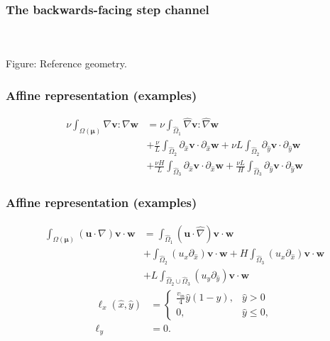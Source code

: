 \documentclass{beamer}
\begin{document}
\begin{frame}
  \frametitle{The backwards-facing step channel}
  \begin{center}
    \\~\\
    Figure: Reference geometry.
  \end{center}
\end{frame}

\begin{frame}
  \frametitle{Affine representation (examples)}
  \begin{align*}
    \nu \int_{\Omega(\bm \mu)} \nabla \bm v : \nabla \bm w
    &= \nu \int_{\hat{\Omega}_1} \hat{\nabla} \bm v : \hat{\nabla} \bm w \\
    &+ \frac{\nu}{L} \int_{\hat{\Omega}_2} \partial_{\hat{x}} \bm v \cdot \partial_{\hat{x}} \bm w
      + \nu L \int_{\hat{\Omega}_2} \partial_{\hat{y}} \bm v \cdot \partial_{\hat{y}} \bm w \\
    &+ \frac{\nu H}{L} \int_{\hat{\Omega}_3} \partial_{\hat{x}} \bm v \cdot \partial_{\hat{x}} \bm w
      + \frac{\nu L}{H} \int_{\hat{\Omega}_3} \partial_{\hat{y}} \bm v \cdot \partial_{\hat{y}} \bm w
  \end{align*}
\end{frame}

\begin{frame}
  \frametitle{Affine representation (examples)}
  \begin{align*}
    \int_{\Omega(\bm \mu)} (\bm u \cdot \nabla) \bm v \cdot \bm w
    &= \int_{\hat{\Omega}_1} (\bm u \cdot \hat{\nabla}) \bm v \cdot \bm w \\
    &+ \int_{\hat{\Omega}_2} (u_{x} \partial_{\hat{x}}) \bm v \cdot \bm w
      + H \int_{\hat{\Omega}_3} (u_{x} \partial_{\hat{x}}) \bm v \cdot \bm w \\
    &+ L \int_{\hat{\Omega}_2 \cup \hat{\Omega}_3}
      (u_{y} \partial_{\hat{y}}) \bm v \cdot \bm w
  \end{align*}
  \begin{align*}
    \ell_x(\hat{x}, \hat{y}) &= \begin{cases}
      \frac{v_\text{in}}{4} \hat{y}(1-\hat{y}), & \hat{y} > 0 \\
      0, & \hat{y} \leq 0,
    \end{cases} \\
    \ell_y &= 0.
  \end{align*}
\end{frame}
\end{document}

